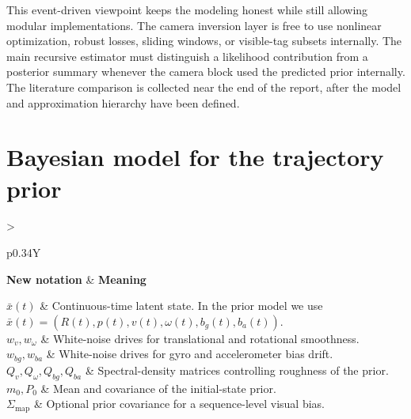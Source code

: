 \documentclass[11pt]{report}
\newcommand{\NotationTable}[1]{%
\vspace{0.6mm}
{\scriptsize
\setlength{\tabcolsep}{2.5pt}
\begin{tabularx}{\columnwidth}{>{\raggedright\arraybackslash}p{0.34\columnwidth}Y}
\toprule
\textbf{New notation} & \textbf{Meaning}\\
\midrule
#1\\
\bottomrule
\end{tabularx}}
\vspace{0.8mm}}
\begin{document}
This event-driven viewpoint keeps the modeling honest while still allowing modular implementations. The camera inversion layer is free to use nonlinear optimization, robust losses, sliding windows, or visible-tag subsets internally. The main recursive estimator must distinguish a likelihood contribution from a posterior summary whenever the camera block used the predicted prior internally. The literature comparison is collected near the end of the report, after the model and approximation hierarchy have been defined.

\section{Bayesian model for the trajectory prior}
\NotationTable{
$\bar x(t)$ & Continuous-time latent state. In the prior model we use $\bar x(t)=(R(t),p(t),v(t),\omega(t),b_g(t),b_a(t))$.\\
$w_v,w_\omega$ & White-noise drives for translational and rotational smoothness.\\
$w_{bg},w_{ba}$ & White-noise drives for gyro and accelerometer bias drift.\\
$Q_v,Q_\omega,Q_{bg},Q_{ba}$ & Spectral-density matrices controlling roughness of the prior.\\
$m_0,P_0$ & Mean and covariance of the initial-state prior.\\
$\Sigma_{\mathrm{map}}$ & Optional prior covariance for a sequence-level visual bias.}
\end{document}
